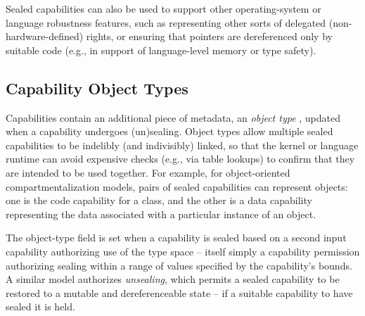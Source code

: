 Sealed capabilities can also be used to support other operating-system or
language robustness features, such as representing other sorts of delegated
(non-hardware-defined) rights, or ensuring that pointers are dereferenced only
by suitable code (e.g., in support of language-level memory or type safety).


\subsection{Capability Object Types}
\label{sec:model-object-types}

Capabilities contain an additional piece of metadata, an \textit{object
type}%
%
, updated when a capability undergoes (un)sealing.
Object types allow multiple sealed capabilities to be indelibly (and
indivisibly) linked, so that the kernel or language runtime can avoid
expensive checks (e.g., via table lookups) to confirm that they are intended
to be used together.
%
%
For example, for object-oriented compartmentalization models,
pairs of sealed capabilities can represent
objects: one is the code capability for a class, and the other is a data
capability representing the data associated with a particular instance of an
object.

The object-type field is set when a capability is sealed based on a second
input capability authorizing use of the type space -- itself simply a
capability permission authorizing sealing within a range of values specified
by the capability's bounds.
A similar model authorizes \textit{unsealing}, which permits a sealed
capability to be restored to a mutable and dereferenceable state -- if a
suitable capability to have sealed it is held.

